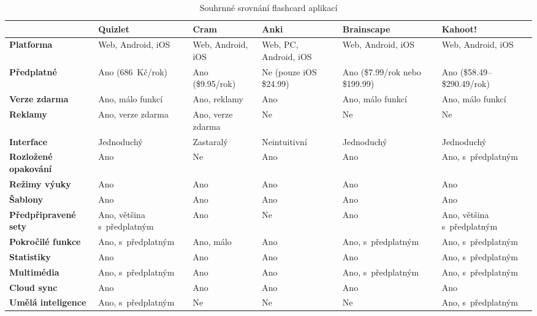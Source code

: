 \documentclass[twoside]{ctuthesis}
\begin{document}
\begin{table}[H]
\caption{Souhrnné srovnání flashcard aplikací}
\centering
\begin{tabular}{| >{\centering\arraybackslash}m{2cm} | >{\centering\arraybackslash}m{2.17cm} | >{\centering\arraybackslash}m{1.74cm} | >{\centering\arraybackslash}m{1.87cm} | >{\centering\arraybackslash}m{2.17cm} | >{\centering\arraybackslash}m{2.17cm} |}
\hline
 & \textbf{Quizlet} & \textbf{Cram} & \textbf{Anki} & \textbf{Brainscape} & \textbf{Kahoot!} \\ \hline
\textbf{Platforma} & Web, Android, iOS & Web, Android, iOS & Web, PC, Android, iOS & Web, Android, iOS & Web, Android, iOS \\ \hline
\textbf{Předplatné} & Ano (686~Kč/rok) & Ano (\$9.95/rok) & Ne (pouze iOS \$24.99) & Ano (\$7.99/rok nebo \$199.99) & Ano (\$58.49--\$290.49/rok) \\ \hline
\textbf{Verze zdarma} & Ano, málo funkcí & Ano, reklamy & Ano & Ano, málo funkcí & Ano, málo funkcí \\ \hline
\textbf{Reklamy} & Ano, verze zdarma & Ano, verze zdarma & Ne & Ne & Ne \\ \hline
\textbf{Interface} & Jednoduchý & Zastaralý & Neintuitivní & Jednoduchý & Jednoduchý \\ \hline
\textbf{Rozložené opakování} & Ano & Ne & Ano & Ano & Ano, s~předplatným \\ \hline
\textbf{Režimy výuky} & Ano & Ano & Ano & Ano & Ano \\ \hline
\textbf{Šablony} & Ano & Ano & Ano & Ano & Ano \\ \hline
\textbf{Před\-připravené sety} & Ano, většina s~předplatným & Ano & Ne & Ano & Ano, většina s~předplatným \\ \hline
\textbf{Pokročilé funkce} & Ano, s~předplatným & Ano, málo & Ano & Ano, s~předplatným & Ano, s~předplatným \\ \hline
\textbf{Statistiky} & Ano & Ano & Ano & Ano & Ano, s~předplatným \\ \hline
\textbf{Multi\-média} & Ano, s~předplatným & Ano & Ano & Ano, s~předplatným & Ano, s~předplatným \\ \hline
\textbf{Cloud sync} & Ano & Ano & Ano & Ano & Ano \\ \hline
\textbf{Umělá inteligence} & Ano, s~předplatným & Ne & Ne & Ne & Ano, s~předplatným \\ \hline
\end{tabular}
\label{tab:shrnuti}
\end{table}
\end{document}
